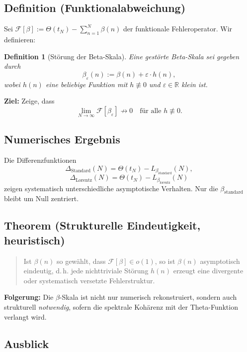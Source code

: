 \documentclass[12pt]{article}
\newtheorem{definition}{Definition}
\begin{document}
\subsection{Definition (Funktionalabweichung)}

Sei \(\mathcal{F}[\beta] := \Theta(t_N) - \sum_{n=1}^{N} \beta(n)\) der funktionale Fehleroperator. Wir definieren:

\begin{definition}[Störung der Beta-Skala]
Eine gestörte Beta-Skala sei gegeben durch
\[
\beta_\varepsilon(n) := \beta(n) + \varepsilon \cdot h(n),
\]
wobei \(h(n)\) eine beliebige Funktion mit \(h \not\equiv 0\) und \(\varepsilon \in \mathbb{R}\) klein ist.
\end{definition}

\textbf{Ziel:} Zeige, dass
\[
\lim_{N \to \infty} \mathcal{F}[\beta_\varepsilon] \not\to 0
\quad \text{für alle } h \not\equiv 0.
\]

\subsection{Numerisches Ergebnis}

Die Differenzfunktionen
\[
\Delta_{\text{Standard}}(N) = \Theta(t_N) - L_{\beta_{\text{standard}}}(N),
\]
\[
\Delta_{\text{Lorentz}}(N) = \Theta(t_N) - L_{\beta_{\text{lorentz}}}(N)
\]
zeigen systematisch unterschiedliche asymptotische Verhalten. Nur die \(\beta_{\text{standard}}\) bleibt um Null zentriert.

\subsection{Theorem (Strukturelle Eindeutigkeit, heuristisch)}

\begin{quote}
Ist \(\beta(n)\) so gewählt, dass \(\mathcal{F}[\beta] \in o(1)\), so ist \(\beta(n)\) asymptotisch eindeutig, d.\,h. jede nichttriviale Störung \(h(n)\) erzeugt eine divergente oder systematisch versetzte Fehlerstruktur.
\end{quote}

\textbf{Folgerung:} Die \(\beta\)-Skala ist nicht nur numerisch rekonstruiert, sondern auch strukturell \emph{notwendig}, sofern die spektrale Kohärenz mit der Theta-Funktion verlangt wird.

\subsection{Ausblick}
\end{document}
